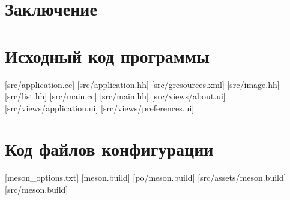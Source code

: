\documentclass[variant=courcework]{bsuir}
\begin{document}
% 

% 

% 

\chapter*{Заключение}



\chapter[обязательное]{Исходный код программы}

[src/application.cc]
[src/application.hh]
[src/gresources.xml]
[src/image.hh]
[src/list.hh]
[src/main.cc]
[src/main.hh]
[src/views/about.ui]
[src/views/application.ui]
[src/views/preferences.ui]

\chapter[справочное]{Код файлов конфигурации}

[meson\_options.txt]
[meson.build]
[po/meson.build]
[src/assets/meson.build]
[src/meson.build]





\end{document}
